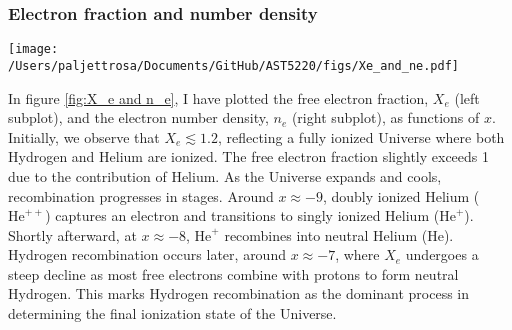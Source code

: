 \documentclass{aa}
\numberwithin{equation}{section}
\numberwithin{table}{section}
\numberwithin{figure}{section}
\begin{document}



\subsubsection{Electron fraction and number density}

\begin{figure*}
  \centering
  \texttt{[image: /Users/paljettrosa/Documents/GitHub/AST5220/figs/Xe\_and\_ne.pdf]}
  \caption{The evolution of the free electron fraction $X_e$ (left) and the free electron number density $n_e$ (right) as functions of $x = \log(a)$. The dashed blue line marks the time of recombination estimated using only the Saha approximation, while the solid line shows the result from solving the Peebles equation. The significant difference illustrates the limitations of assuming equilibrium. 
  }\label{fig:X_e and n_e}
\end{figure*}

In figure \ref{fig:X_e and n_e}, I have plotted the free electron fraction, $X_e$ (left subplot), and the electron number density, $n_e$ (right subplot), as functions of $x$. Initially, we observe that $X_e \lesssim 1.2$, reflecting a fully ionized Universe where both Hydrogen and Helium are ionized. The free electron fraction slightly exceeds 1 due to the contribution of Helium. As the Universe expands and cools, recombination progresses in stages. Around $x \approx -9$, doubly ionized Helium ($\text{He}^{++}$) captures an electron and transitions to singly ionized Helium ($\text{He}^+$). Shortly afterward, at $x \approx -8$, $\text{He}^{+}$ recombines into neutral Helium ($\text{He}$). Hydrogen recombination occurs later, around $x \approx -7$, where $X_e$ undergoes a steep decline as most free electrons combine with protons to form neutral Hydrogen. This marks Hydrogen recombination as the dominant process in determining the final ionization state of the Universe.
\end{document}
